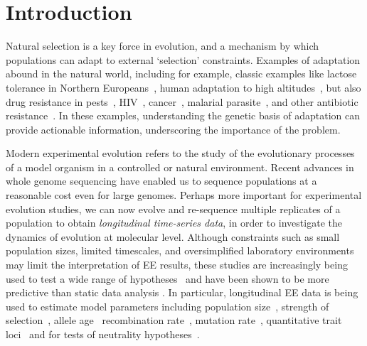 \section{Introduction}
Natural selection is a key force in evolution, and a mechanism by
which populations can adapt to external `selection'
constraints. Examples of adaptation abound in the natural world,
including for example, classic examples like lactose tolerance in
Northern Europeans~\cite{bersaglieri2004genetic}, human adaptation to
high altitudes~\cite{yi2010sequencing,simonson2010genetic}, but also
drug resistance in pests~\cite{daborn2001ddt},
HIV~\cite{Feder2016More},
cancer~\cite{gottesman2002mechanisms,zahreddine2013mechanisms},
malarial parasite~\cite{ariey2014molecular,nair2007recurrent}, and
other antibiotic resistance~\cite{spellberg2008epidemic}. In these
examples, understanding the genetic basis of adaptation can provide
actionable information, underscoring the importance of the problem.

Modern experimental evolution refers to the study of the evolutionary
processes of a model organism in a controlled
\cite{hegreness2006equivalence,lang2013pervasive,orozco2012adaptation,
  lang2011genetic,barrick2009genome,bollback2007clonal,oz2014strength}
or natural
\cite{maldarelli2013hiv,reid2011new,denef2012situ,winters2012development,
  daniels2013genetic,barrett2008natural,bergland2014genomic}
environment. Recent advances in whole genome sequencing have enabled
us to sequence populations at a reasonable cost even for large
genomes. Perhaps more important for experimental evolution studies, we
can now evolve and re-sequence multiple replicates of a population to
obtain \emph{longitudinal time-series data}, in order to investigate
the dynamics of evolution at molecular level.  Although constraints
such as small population sizes, limited timescales, and oversimplified
laboratory environments may limit the interpretation of EE results,
these studies are increasingly being used to test a wide range of
hypotheses~\cite{kawecki2012experimental} and have been shown to be
more predictive than static data analysis
\cite{boyko2008assessing,desai2008polymorphism,sawyer1992population}.
In particular, longitudinal EE data is being used to estimate model
parameters including population
size~\cite{williamson1999using,wang2001pseudo,pollak1983new,waples1989generalized,
  Terhorst2015Multi}, strength of
selection~\cite{mathieson2013estimating,illingworth2011distinguishing,Terhorst2015Multi,
  bollback2008estimation,illingworth2012quantifying,malaspinas2012estimating,
  Steinrücken2014a}, allele age~\cite{malaspinas2012estimating}
recombination rate~\cite{Terhorst2015Multi}, mutation
rate~\cite{Barrick2013Genome, Terhorst2015Multi}, quantitative trait
loci~\cite{baldwin2014power} and for tests of neutrality
hypotheses~\cite{feder2014Identifying,Terhorst2015Multi,burke2010genome,bergland2014genomic}.

